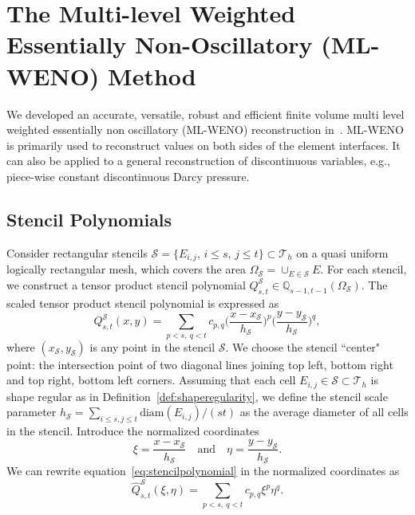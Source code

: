 \section[ML-WENO]{The Multi-level Weighted Essentially Non-Oscillatory (ML-WENO) Method}
\label{sec:mlweno}
We developed an accurate, versatile, robust and efficient finite volume 
multi level weighted essentially non oscillatory (ML-WENO) reconstruction
in~\cite{MultiLevelWeno}.
ML-WENO is primarily used to reconstruct 
values on both sides of the element interfaces.
It can also be applied to a general 
reconstruction of discontinuous variables, e.g., piece-wise constant discontinuous Darcy pressure.

\subsection{Stencil Polynomials}
Consider rectangular stencils $\mathcal{S} = \{E_{i,j},\, i\leq s,\, j\leq t\} \subset \mathcal{T}_h$ on a quasi uniform 
logically rectangular mesh, which covers the area $\Omega_{\mathcal{S}} = \cup_{E \in \mathcal{S}} E$.
For each stencil, we
construct a tensor product stencil polynomial 
$Q^{\mathcal{S}}_{s,t} \in \mathbb{Q}_{s-1,t-1}(\Omega_{\mathcal{S}})$. %
The scaled tensor product stencil polynomial is expressed as
\begin{equation} \label{eq:stencilpolynomial}
		  Q^{\mathcal{S}}_{s,t}(x,y) = \sum_{p<s,\  q<t} c_{p,q} \Big(\frac{x - x_\mathcal{S}}{h_\mathcal{S}}\Big)^p 
		  \Big(\frac{y - y_\mathcal{S}}{h_\mathcal{S}}\Big)^q,
\end{equation}
where $(x_\mathcal{S},y_\mathcal{S})$ is any point in the stencil 
$\mathcal{S}$. We choose the stencil ``center" point: the intersection point of two diagonal lines joining top left, bottom right
and top right, bottom left corners.
Assuming that each cell $E_{i,j} \in \mathcal{S} \subset \mathcal{T}_h$ is shape regular as in Definition~\ref{def:shaperegularity},
we define the stencil scale parameter $h_\mathcal{S} = 
\sum_{i\leq s, j\leq t}\text{diam}(E_{i,j})/(s t)$ as the average diameter of all cells in the stencil. 
Introduce the normalized coordinates
\begin{equation}
\xi = \frac{x-x_\mathcal{S}}{h_\mathcal{S}}\quad \text{and} \quad \eta = \frac{y-y_\mathcal{S}}{h_\mathcal{S}}.
\end{equation}
We can rewrite equation~\eqref{eq:stencilpolynomial} in the normalized coordinates as
\begin{equation}\label{eq:stencilpolynomialscaled}
		  \hat{Q}^{\mathcal{S}}_{s,t}(\xi, \eta) = \sum_{p<s,\ q<t} c_{p,q} \xi^p \eta^q.
\end{equation}

